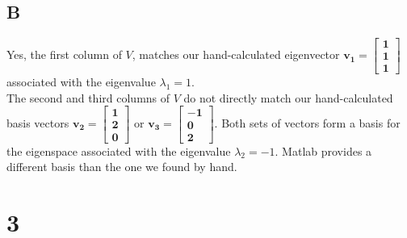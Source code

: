 \documentclass{article}
\newcommand{\vect}[1]{\begin{bmatrix} #1 \end{bmatrix}}
\begin{document}
\subsection*{B}

Yes, the first column of $V$, matches our hand-calculated eigenvector $\mathbf{v_1 = \vect{1 \\ 1 \\ 1}}$ associated with the eigenvalue $\lambda_1 = 1$.\\
The second and third columns of $V$ do not directly match our hand-calculated basis vectors $\mathbf{v_2 = \vect{1 \\ 2 \\ 0}}$ or $\mathbf{v_3 = \vect{-1 \\ 0 \\ 2}}$. Both sets of vectors form a basis for the eigenspace associated with the eigenvalue $\lambda_2 = -1$. Matlab provides a different basis than the one we found by hand.

\section*{3}
\end{document}
